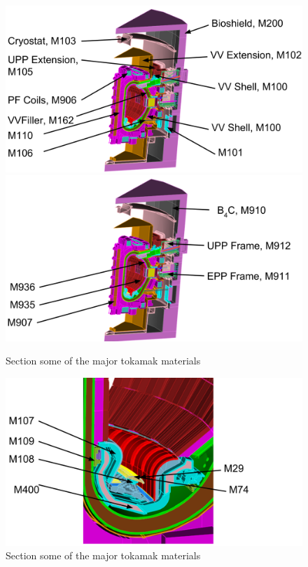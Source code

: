 \documentclass[12pt]{article}
\begin{document}
\begin{figure}[p]
  \centering
  \includegraphics[scale=0.32]{../plots/cad/mats/label_1.png}
  \includegraphics[scale=0.32]{../plots/cad/mats/label_2.png}
  \caption{Section some of the major tokamak materials}
  \label{fig:material_assign_1}
\end{figure}

\begin{figure}[p]
  \centering
  \includegraphics[scale=0.32]{../plots/cad/mats/label_3.png}
  \caption{Section some of the major tokamak materials}
  \label{fig:material_assign_2}
\end{figure}
\end{document}
